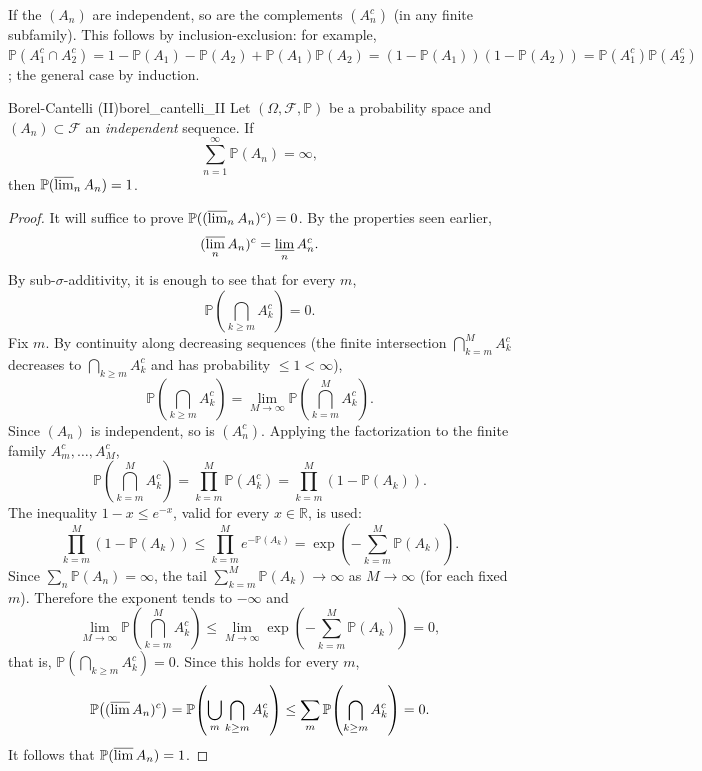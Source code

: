 \documentclass[11pt, a4paper]{article}
\begin{document}
\obs If the $(A_n)$ are independent, so are the complements $(A_n^c)$ (in any
finite subfamily). This follows by inclusion-exclusion: for example, $\mathbb{P}(A_1^c \cap
A_2^c) = 1 - \mathbb{P}(A_1) - \mathbb{P}(A_2) + \mathbb{P}(A_1) \mathbb{P}(A_2) = (1 -
\mathbb{P}(A_1))(1 - \mathbb{P}(A_2)) = \mathbb{P}(A_1^c) \mathbb{P}(A_2^c)$; the general case by
induction.

\begin{teorema}{Borel-Cantelli (II)}{borel_cantelli_II}
Let $(\Omega, \mathcal{F}, \mathbb{P})$ be a probability space and $(A_n) \subset \mathcal{F}$ an
\emph{independent} sequence. If
$$ \sum_{n=1}^\infty \mathbb{P}(A_n) = \infty, $$
then $\mathbb{P}(\varlimsup_n A_n) = 1$.
\end{teorema}

\begin{proof}
It will suffice to prove $\mathbb{P}((\varlimsup_n A_n)^c) = 0$. By the properties seen earlier,
$$ (\varlimsup_n A_n)^c = \varliminf_n A_n^c. $$
By sub-$\sigma$-additivity, it is enough to see that for every $m$,
$$ \mathbb{P}\!\left(\bigcap_{k \ge m} A_k^c\right) = 0. $$
Fix $m$. By continuity along decreasing sequences (the finite intersection $\bigcap_{k =
m}^M A_k^c$ decreases to $\bigcap_{k \ge m} A_k^c$ and has probability $\le 1 < \infty$),
$$ \mathbb{P}\!\left(\bigcap_{k \ge m} A_k^c\right) = \lim_{M \to \infty} \mathbb{P}\!\left(
\bigcap_{k = m}^M A_k^c\right). $$
Since $(A_n)$ is independent, so is $(A_n^c)$. Applying the
factorization to the finite family $A_m^c, \dots, A_M^c$,
$$ \mathbb{P}\!\left(\bigcap_{k = m}^M A_k^c\right) = \prod_{k = m}^M \mathbb{P}(A_k^c) =
\prod_{k = m}^M (1 - \mathbb{P}(A_k)). $$
The inequality $1 - x \le e^{-x}$, valid for every $x \in \mathbb{R}$, is used:
$$ \prod_{k = m}^M (1 - \mathbb{P}(A_k)) \le \prod_{k = m}^M e^{-\mathbb{P}(A_k)} =
\exp\!\left(-\sum_{k = m}^M \mathbb{P}(A_k)\right). $$
Since $\sum_n \mathbb{P}(A_n) = \infty$, the tail $\sum_{k = m}^M \mathbb{P}(A_k) \to \infty$ as
$M \to \infty$ (for each fixed $m$). Therefore the exponent tends to $-\infty$ and
$$ \lim_{M \to \infty} \mathbb{P}\!\left(\bigcap_{k = m}^M A_k^c\right) \le \lim_{M \to \infty}
\exp\!\left(-\sum_{k = m}^M \mathbb{P}(A_k)\right) = 0, $$
that is, $\mathbb{P}(\bigcap_{k \ge m} A_k^c) = 0$. Since this holds for every $m$,
$$ \mathbb{P}\!\left((\varlimsup A_n)^c\right) = \mathbb{P}\!\left(\bigcup_m \bigcap_{k \ge m}
A_k^c\right) \le \sum_m \mathbb{P}\!\left(\bigcap_{k \ge m} A_k^c\right) = 0. $$
It follows that $\mathbb{P}(\varlimsup A_n) = 1$.
\end{proof}
\end{document}
